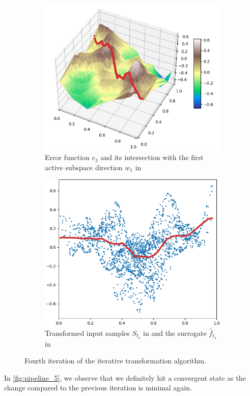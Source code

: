 \documentclass[
  a4paper,  %
  twoside,  %
  bibliography=totoc,
  headsepline,
  cleardoublepage=empty,
  parskip=half,
  draft=false
]{scrbook}
\begin{document}
\begin{mdframed}[style=style]
\begin{figure}[H]
\begin{subfigure}{.5\textwidth}
  \centering
  \includegraphics[width=.75\linewidth]{graphics/pipeline_current_4.png}
  \caption{Error function $e_3$ and its intersection with the first active subspace direction $w_1$ in \reddot}
\end{subfigure}%
\begin{subfigure}{.5\textwidth}
  \centering
  \includegraphics[width=.75\linewidth]{graphics/pipeline_local_4.png}
  \caption{Transformed input samples $S_{t_4}$ in \blue and the surrogate $\hat{f}_{t_4}$ in \reddot}
\end{subfigure}
\delimit
\caption{Fourth iteration of the iterative transformation algorithm.}
\label{fig:pipeline_4}
\end{figure}
\end{mdframed}
%
In \cref{fig:pipeline_5}, we observe that we definitely hit a convergent state as the change compared to the previous iteration is minimal again.
\end{document}
